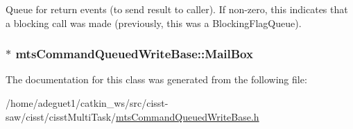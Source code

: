 Queue for return events (to send result to caller). If non-\/zero, this indicates that a blocking call was made (previously, this was a Blocking\-Flag\-Queue). \hypertarget{classmts_command_queued_write_base_aff12f0b8e184ae4891388a5c0c647724}{
\subsubsection[{Mail\-Box}]{$\ast$ mts\-Command\-Queued\-Write\-Base\-::\-Mail\-Box\hspace{0.3cm}{\ttfamily [protected]}}}\label{classmts_command_queued_write_base_aff12f0b8e184ae4891388a5c0c647724}


The documentation for this class was generated from the following file\-:\begin{DoxyCompactItemize}
\item 
/home/adeguet1/catkin\-\_\-ws/src/cisst-\/saw/cisst/cisst\-Multi\-Task/\hyperlink{mts_command_queued_write_base_8h}{mts\-Command\-Queued\-Write\-Base.\-h}\end{DoxyCompactItemize}

